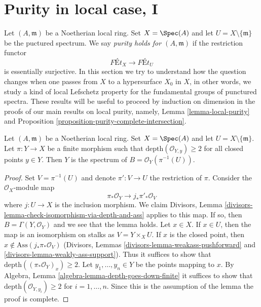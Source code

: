 


























\section{Purity in local case, I}
\label{section-local-purity}

\noindent
Let $(A, \mathfrak m)$ be a Noetherian local ring. Set $X = \Spec(A)$
and let $U = X \setminus \{\mathfrak m\}$ be the puctured spectrum.
We say {\it purity holds for $(A, \mathfrak m)$} if the restriction functor
$$
\textit{F\'Et}_X \longrightarrow \textit{F\'Et}_U
$$
is essentially surjective. In this section we try to understand how the
question changes when one passes from $X$ to a hypersurface $X_0$ in $X$,
in other words, we study a kind of local Lefschetz property for the
fundamental groups of punctured spectra.
These results will be useful to proceed by induction on dimension
in the proofs of our main results on local purity, namely,
Lemma \ref{lemma-local-purity} and
Proposition \ref{proposition-purity-complete-intersection}.

\begin{lemma}
\label{lemma-sections-over-punctured-spec}
Let $(A, \mathfrak m)$ be a Noetherian local ring. Set $X = \Spec(A)$
and let $U = X \setminus \{\mathfrak m\}$.
Let $\pi : Y \to X$ be a finite morphism such that
$\text{depth}(\mathcal{O}_{Y, y}) \geq 2$ for all closed points
$y \in Y$.
Then $Y$ is the spectrum of $B = \mathcal{O}_Y(\pi^{-1}(U))$.
\end{lemma}

\begin{proof}
Set $V = \pi^{-1}(U)$ and denote $\pi' : V \to U$ the restriction of $\pi$.
Consider the $\mathcal{O}_X$-module map
$$
\pi_*\mathcal{O}_Y \longrightarrow j_*\pi'_*\mathcal{O}_V
$$
where $j : U \to X$ is the inclusion morphism. We claim
Divisors, Lemma \ref{divisors-lemma-check-isomorphism-via-depth-and-ass}
applies to this map. If so, then $B = \Gamma(Y, \mathcal{O}_Y)$
and we see that the lemma holds. Let $x \in X$.
If $x \in U$, then the map is an
isomorphism on stalks as $V = Y \times_X U$.
If $x$ is the closed point, then
$x \not \in \text{Ass}(j_*\pi_*\mathcal{O}_V)$
(Divisors, Lemmas \ref{divisors-lemma-weakass-pushforward} and
\ref{divisors-lemma-weakly-ass-support}).
Thus it suffices to show that
$\text{depth}((\pi_*\mathcal{O}_Y)_x) \geq 2$.
Let $y_1, \ldots, y_n \in Y$ be the points mapping to $x$.
By Algebra, Lemma \ref{algebra-lemma-depth-goes-down-finite}
it suffices to show that
$\text{depth}(\mathcal{O}_{Y, y_i}) \geq 2$ for $i = 1, \ldots, n$.
Since this is the assumption of the lemma the proof is complete.
\end{proof}

